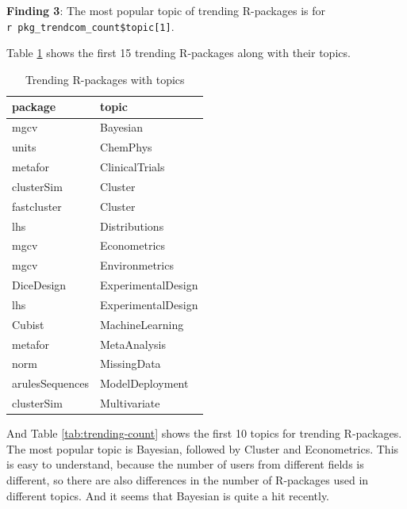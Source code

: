 \documentclass[
]{book}
\newenvironment{discovery}[1]{%
  \begin{tcolorbox}[colback=blue!30,colframe=blue!80!black]#1}{\end{tcolorbox}}
\begin{document}
\begin{discovery}
\textbf{Finding 3}: The most popular topic of trending R-packages is for
\texttt{r\ pkg\_trendcom\_count\$topic{[}1{]}}.
\end{discovery}

Table \ref{tab:trending-topic} shows the first 15 trending R-packages along with their topics.

\begin{table}

\caption{\label{tab:trending-topic}Trending R-packages with topics}
\centering
\begin{tabular}[t]{l|l}
\hline
package & topic\\
\hline
mgcv & Bayesian\\
\hline
units & ChemPhys\\
\hline
metafor & ClinicalTrials\\
\hline
clusterSim & Cluster\\
\hline
fastcluster & Cluster\\
\hline
lhs & Distributions\\
\hline
mgcv & Econometrics\\
\hline
mgcv & Environmetrics\\
\hline
DiceDesign & ExperimentalDesign\\
\hline
lhs & ExperimentalDesign\\
\hline
Cubist & MachineLearning\\
\hline
metafor & MetaAnalysis\\
\hline
norm & MissingData\\
\hline
arulesSequences & ModelDeployment\\
\hline
clusterSim & Multivariate\\
\hline
\end{tabular}
\end{table}

And Table \ref{tab:trending-count} shows the first 10 topics for trending R-packages. The most popular topic is Bayesian, followed by Cluster and Econometrics. This is easy to understand, because the number of users from different fields is different, so there are also differences in the number of R-packages used in different topics. And it seems that Bayesian is quite a hit recently.
\end{document}
